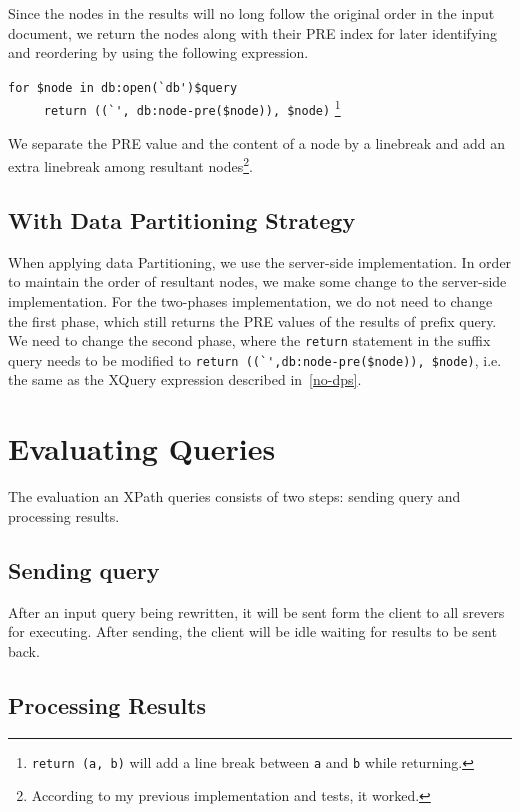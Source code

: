 Since the nodes in the results will no long follow the original order in the
input document, we return the nodes along with their PRE index for later
identifying and reordering by using the following expression.

\verb|for $node in db:open(`db')$query|\\
\verb|     return ((`', db:node-pre($node)), $node)|
\footnote{\texttt{return (a, b)} will add a line break between \texttt{a} and
	\texttt{b} while returning.}

We separate the PRE value and the content of a node by a linebreak and add an
extra linebreak among resultant nodes\footnote{According to my previous
	implementation and tests, it worked.}.


\subsection{With Data Partitioning Strategy}

When applying data Partitioning, we use the server-side implementation. In
order to maintain the order of resultant nodes, we make some change to the
server-side implementation. For the two-phases implementation, we do not need to
change the first phase, which still returns the PRE values of the results of
prefix query. We need to change the second phase, where the \verb|return|
statement in the suffix query needs to be modified to 
\verb|return ((`',db:node-pre($node)), $node)|, 
i.e. the same as the XQuery expression described in~\ref{no-dps}.

 

\section{Evaluating Queries}

The evaluation an XPath queries consists of two steps: sending query and
processing results.

\subsection{Sending query}

After an input query being rewritten, it will be sent form the client to all
srevers for executing. After sending, the client will be idle waiting for
results to be sent back.

\subsection{Processing Results}

